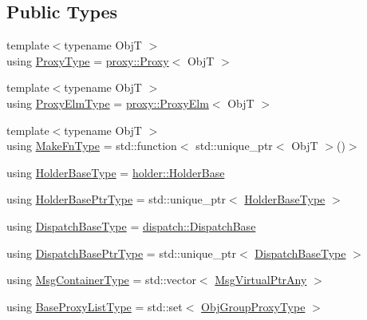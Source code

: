 \subsection*{Public Types}
\begin{DoxyCompactItemize}
\item 
{\footnotesize template$<$typename ObjT $>$ }\\using \hyperlink{structvt_1_1objgroup_1_1_obj_group_manager_aea65eef52f240a52210132eef5ce591f}{Proxy\+Type} = \hyperlink{structvt_1_1objgroup_1_1proxy_1_1_proxy}{proxy\+::\+Proxy}$<$ ObjT $>$
\item 
{\footnotesize template$<$typename ObjT $>$ }\\using \hyperlink{structvt_1_1objgroup_1_1_obj_group_manager_adba6c8ecb0f4c30e719f1abb995cfc9b}{Proxy\+Elm\+Type} = \hyperlink{structvt_1_1objgroup_1_1proxy_1_1_proxy_elm}{proxy\+::\+Proxy\+Elm}$<$ ObjT $>$
\item 
{\footnotesize template$<$typename ObjT $>$ }\\using \hyperlink{structvt_1_1objgroup_1_1_obj_group_manager_a397d787b3876752a6d70511b2769b872}{Make\+Fn\+Type} = std\+::function$<$ std\+::unique\+\_\+ptr$<$ ObjT $>$()$>$
\item 
using \hyperlink{structvt_1_1objgroup_1_1_obj_group_manager_a4898fc9cabf44890e5593f8c4ab86230}{Holder\+Base\+Type} = \hyperlink{structvt_1_1objgroup_1_1holder_1_1_holder_base}{holder\+::\+Holder\+Base}
\item 
using \hyperlink{structvt_1_1objgroup_1_1_obj_group_manager_ac1e9bb19d4a5923dd6d595bad28f04c9}{Holder\+Base\+Ptr\+Type} = std\+::unique\+\_\+ptr$<$ \hyperlink{structvt_1_1objgroup_1_1_obj_group_manager_a4898fc9cabf44890e5593f8c4ab86230}{Holder\+Base\+Type} $>$
\item 
using \hyperlink{structvt_1_1objgroup_1_1_obj_group_manager_ae89a82f6bfca9bbd007791f1cac88f8f}{Dispatch\+Base\+Type} = \hyperlink{structvt_1_1objgroup_1_1dispatch_1_1_dispatch_base}{dispatch\+::\+Dispatch\+Base}
\item 
using \hyperlink{structvt_1_1objgroup_1_1_obj_group_manager_a8f2ded4cfa63faa119c2bd550764878f}{Dispatch\+Base\+Ptr\+Type} = std\+::unique\+\_\+ptr$<$ \hyperlink{structvt_1_1objgroup_1_1_obj_group_manager_ae89a82f6bfca9bbd007791f1cac88f8f}{Dispatch\+Base\+Type} $>$
\item 
using \hyperlink{structvt_1_1objgroup_1_1_obj_group_manager_a1c15dbd443c4cfae515ca3587f93a2b8}{Msg\+Container\+Type} = std\+::vector$<$ \hyperlink{namespacevt_a54674b9f819f4f3a652c6f78d9b62aaf}{Msg\+Virtual\+Ptr\+Any} $>$
\item 
using \hyperlink{structvt_1_1objgroup_1_1_obj_group_manager_a497383a759f7426e824b4f7475b3d5d3}{Base\+Proxy\+List\+Type} = std\+::set$<$ \hyperlink{namespacevt_ad7cae989df485fccca57f0792a880a8e}{Obj\+Group\+Proxy\+Type} $>$
\end{DoxyCompactItemize}
